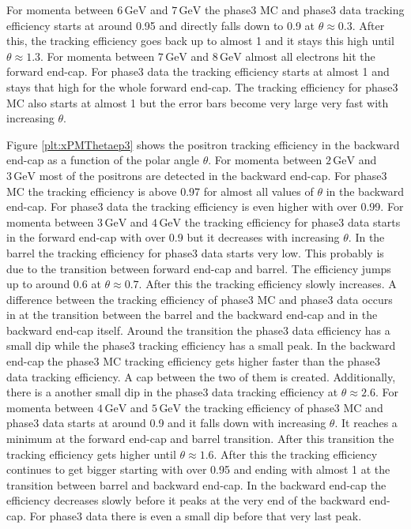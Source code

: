\documentclass[a4paper,11pt,twosided,final,german,openbib,pdftex,listof=totoc,bibliography=totoc]{scrbook}
\begin{document}
For momenta between $6\,\textrm{GeV}$ and $7\,\textrm{GeV}$ the phase3 MC and phase3 data tracking efficiency starts at around 0.95 and directly falls down to 0.9 at $\theta \approx 0.3$. After this, the tracking efficiency goes back up to almost 1 and it stays this high until $\theta \approx 1.3$.
For momenta between $7\,\textrm{GeV}$ and $8\,\textrm{GeV}$ almost all electrons hit the forward end-cap. For phase3 data the tracking efficiency starts at almost 1 and stays that high for the whole forward end-cap. The tracking efficiency for phase3 MC also starts at almost 1 but the error bars become very large very fast with increasing $\theta$.

Figure \ref{plt:xPMThetaep3} shows the positron tracking efficiency in the backward end-cap as a function of the polar angle $\theta$.
For momenta between $2\,\textrm{GeV}$ and $3\,\textrm{GeV}$ most of the positrons are detected in the backward end-cap. For phase3 MC the tracking efficiency is above 0.97 for almost all values of $\theta$ in the backward end-cap. For phase3 data the tracking efficiency is even higher with over 0.99.
For momenta between $3\,\textrm{GeV}$ and $4\,\textrm{GeV}$ the tracking efficiency for phase3 data starts in the forward end-cap with over 0.9 but it decreases with increasing $\theta$. In the barrel the tracking efficiency for phase3 data starts very low. This probably is due to the transition between forward end-cap and barrel. The efficiency jumps up to around 0.6 at $\theta \approx 0.7$. After this the tracking efficiency slowly increases. A difference between the tracking efficiency of phase3 MC and phase3 data occurs in at the transition between the barrel and the backward end-cap and in the backward end-cap itself. Around the transition the phase3 data efficiency has a small dip while the phase3 tracking efficiency has a small peak. In the backward end-cap the phase3 MC tracking efficiency gets higher faster than the phase3 data tracking efficiency. A cap between the two of them is created. Additionally, there is a another small dip in the phase3 data tracking efficiency at $\theta \approx 2.6$. 
For momenta between $4\,\textrm{GeV}$ and $5\,\textrm{GeV}$ the tracking efficiency of phase3 MC and phase3 data starts at around 0.9 and it falls down with increasing $\theta$. It reaches a minimum at the forward end-cap and barrel transition. After this transition the tracking efficiency gets higher until $\theta \approx 1.6$. After this the tracking efficiency continues to get bigger starting with over 0.95 and ending with almost 1 at the transition between barrel and backward end-cap. In the backward end-cap the efficiency decreases slowly before it peaks at the very end of the backward end-cap. For phase3 data there is even a small dip before that very last peak.
\end{document}
